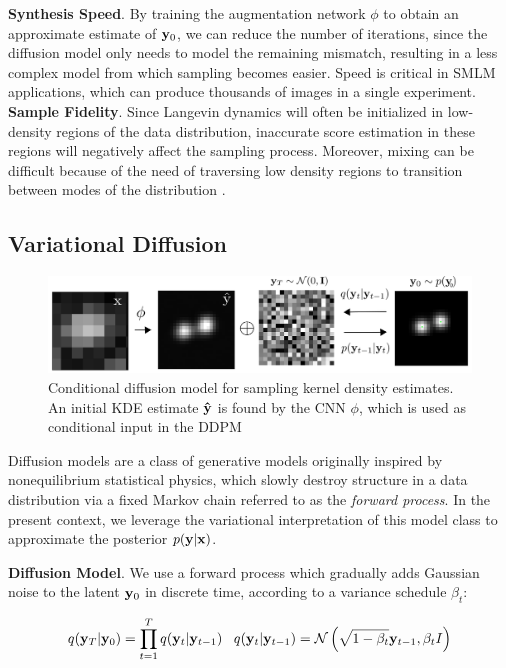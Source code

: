 \documentclass{article}
\begin{document}
\textbf{Synthesis Speed}. By training the augmentation network $\phi$ to obtain an approximate estimate of $\bold{y}_{0}$, we can reduce the number of iterations, since the diffusion model only needs to model the remaining mismatch, resulting in a less complex model from which sampling becomes easier. Speed is critical in SMLM applications, which can produce thousands of images in a single experiment.\\

\textbf{Sample Fidelity}. Since Langevin dynamics will often be initialized in low-density regions of the data distribution, inaccurate score estimation in these regions will negatively affect the sampling process. Moreover, mixing can be difficult because of the need of traversing low density regions to transition between modes of the distribution \citep{Song2019}.

\subsection{Variational Diffusion}

\begin{figure}
\includegraphics[scale=4.5]{media/Denoise.png}
\caption{Conditional diffusion model for sampling kernel density estimates. An initial KDE estimate $\bold{\hat{y}}$ is found by the CNN $\phi$, which is used as conditional input in the DDPM}
\end{figure}

Diffusion models \citep{SohlDickstein2015,Ho2020,Song2021} are a class of generative models originally inspired by nonequilibrium statistical physics, which slowly destroy structure in a data distribution via a fixed Markov chain referred to as the \emph{forward process}. In the present context, we leverage the variational interpretation of this model class \citep{Kingma2021,Kingma2023} to approximate the posterior $p(\bold{y}|\bold{x})$. 

\textbf{Diffusion Model}. We use a forward process which gradually adds Gaussian noise to the latent $\bold{y}_0$ in discrete time, according to a variance schedule $\beta_{t}$:

\begin{equation}
q(\bold{y}_{T}|\bold{y}_{0}) = \prod_{t=1}^{T}q(\bold{y}_{t}|\bold{y}_{t-1}) \;\;\; q(\bold{y}_{t}|\bold{y}_{t-1}) = \mathcal{N}\left(\sqrt{1-\beta_{t}}\bold{y}_{t-1},\beta_t I\right)
\end{equation}
\end{document}
